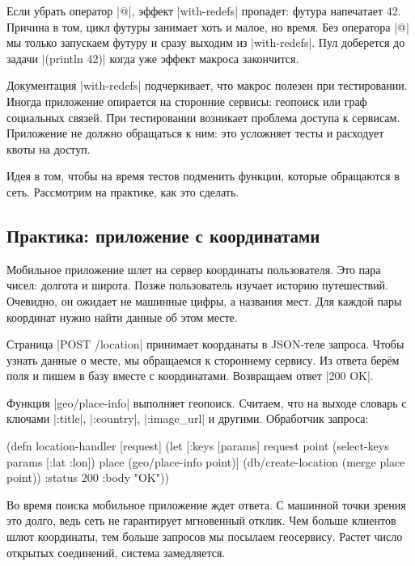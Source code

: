Если убрать оператор \spverb|@|, эффект \spverb|with-redefs| пропадет: футура
напечатает 42. Причина в том, цикл футуры занимает хоть и малое, но время. Без
оператора \spverb|@| мы только запускаем футуру и сразу выходим из
\spverb|with-redefs|. Пул доберется до задачи \spverb|(println 42)| когда уже
эффект макроса закончится.

Документация \spverb|with-redefs| подчеркивает, что макрос полезен при
тестировании. Иногда приложение опирается на сторонние сервисы: геопоиск или
граф социальных связей. При тестировании возникает проблема доступа к
сервисам. Приложение не должно обращаться к ним: это усложняет тесты и расходует
квоты на доступ.

Идея в том, чтобы на время тестов подменить функции, которые обращаются в
сеть. Рассмотрим на практике, как это сделать.

\subsection{Практика: приложение с координатами}

Мобильное приложение шлет на сервер координаты пользователя. Это пара чисел:
долгота и широта. Позже пользователь изучает историю путешествий. Очевидно, он
ожидает не машинные цифры, а названия мест. Для каждой пары координат нужно
найти данные об этом месте.

Страница \spverb|POST /location| принимает коорданаты в JSON-теле запроса. Чтобы
узнать данные о месте, мы обращаемся к стороннему сервису. Из ответа бер\"{е}м
поля и пишем в базу вместе с координатами. Возвращаем ответ \spverb|200 OK|.

Функция \spverb|geo/place-info| выполняет геопоиск. Считаем, что на выходе
словарь с ключами \spverb|:title|, \spverb|:country|, \spverb|:image_url| и
другими. Обработчик запроса:

\begin{english}
  \begin{clojure}
(defn location-handler [request]
  (let [{:keys [params]} request
        point (select-keys params [:lat :lon])
        place (geo/place-info point)]
    (db/create-location (merge place point))
    {:status 200 :body "OK"}))
  \end{clojure}
\end{english}

Во время поиска мобильное приложение ждет ответа. С машинной точки зрения это
долго, ведь сеть не гарантирует мгновенный отклик. Чем больше клиентов шлют
координаты, тем больше запросов мы посылаем геосервису. Растет число
открытых соединений, система замедляется.

